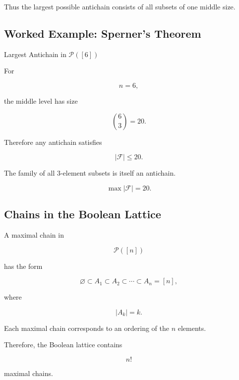 Thus the largest possible antichain consists of all subsets of one
middle size.

\subsection{Worked Example: Sperner's Theorem}
\label{subsec:worked-sperner}

\begin{workedexamplebox}{Largest Antichain in \(\mathcal{P}([6])\)}

For

\[
n=6,
\]

the middle level has size

\[
\binom63=20.
\]

Therefore any antichain satisfies

\[
|\mathcal{F}|\leq20.
\]

The family of all \(3\)-element subsets is itself an antichain.

\begin{answerbox}
\[
\boxed{
\max|\mathcal{F}|=20.
}
\]
\end{answerbox}

\end{workedexamplebox}

\subsection{Chains in the Boolean Lattice}
\label{subsec:chains-boolean-lattice}

A maximal chain in

\[
\mathcal{P}([n])
\]

has the form

\[
\varnothing
\subset
A_1
\subset
A_2
\subset
\cdots
\subset
A_n=[n],
\]

where

\[
|A_k|=k.
\]

Each maximal chain corresponds to an ordering of the \(n\) elements.

Therefore, the Boolean lattice contains

\[
\boxed{
n!
}
\]

maximal chains.

